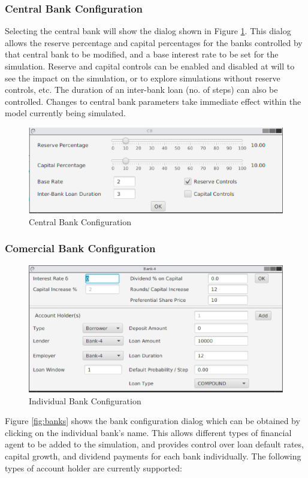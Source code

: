 \documentclass[10pt,oneside,openright, a4paper]{memoir}
\begin{document}
\subsubsection{Central Bank Configuration}
Selecting the central bank will show the dialog shown in Figure \ref{fig:centralbank}.
This dialog allows the 
reserve percentage and capital percentages for the banks controlled
by that central bank to be modified, and a base interest rate to 
be set for the simulation. Reserve and capital controls can be enabled and disabled
at will to see the impact on the simulation, or to explore simulations without
reserve controls, etc. The duration of an inter-bank loan (no. of steps) can
also be controlled. Changes to central bank parameters take immediate
effect within the model currently being simulated.
\begin{figure}[ht]
\begin{center}
\includegraphics[width=14cm]{images/fig_centralbank.eps}
\caption{Central Bank Configuration}
\label{fig:centralbank}
\end{center}
\end{figure}
\newpage
\subsubsection{Comercial Bank Configuration}
\par
\begin{figure}[ht]
\begin{center}
\includegraphics[width=14cm]{images/fig_bank.eps}
\caption{Individual Bank Configuration}
\label{fig:bank}
\end{center}
\end{figure}
\par
Figure \ref{fig:banks} shows the bank configuration dialog which can be
obtained by clicking on the individual bank's name. This allows 
different types of financial agent to be added to the simulation, 
and provides control over loan default rates, capital growth, and 
dividend payments for each bank individually. The following types
of account holder are currently supported:
\par
\end{document}
